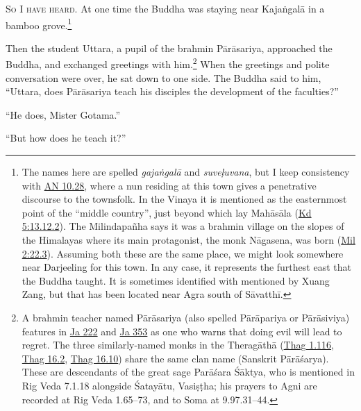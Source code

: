 \documentclass[12pt,openany]{book}%
\newcommand*{\langlzh}[1]{\cjk{#1}\normalfont}%
\newcommand*{\scevam}[1]{\textsc{#1}}
\begin{document}
\scevam{So I have heard. }At one time the Buddha was staying near \textsanskrit{Kajaṅgalā} in a bamboo grove.\footnote{The names here are spelled \textit{\textsanskrit{gajaṅgalā}} and \textit{\textsanskrit{suveḷuvana}}, but I keep consistency with \href{https://suttacentral.net/an10.28/en/sujato}{AN 10.28}, where a nun residing at this town gives a penetrative discourse to the townsfolk. In the Vinaya it is mentioned as the easternmost point of the “middle country”, just beyond which lay \textsanskrit{Mahāsāla} (\href{https://suttacentral.net/pli-tv-kd5/en/sujato\#13.12.2}{Kd 5:13.12.2}). The \textsanskrit{Milindapañha} says it was a brahmin village on the slopes of the Himalayas where its main protagonist, the monk \textsanskrit{Nāgasena}, was born (\href{https://suttacentral.net/mil2/en/sujato\#22.3}{Mil 2:22.3}). Assuming both these are the same place, we might look somewhere near Darjeeling for this town. In any case, it represents the furthest east that the Buddha taught. It is sometimes identified with \langlzh{羯蠅揭羅} mentioned by Xuang Zang, but that has been located near Agra south of \textsanskrit{Sāvatthī}. } 

Then the student Uttara, a pupil of the brahmin \textsanskrit{Pārāsariya}, approached the Buddha, and exchanged greetings with him.\footnote{A brahmin teacher named \textsanskrit{Pārāsariya} (also spelled \textsanskrit{Pārāpariya} or \textsanskrit{Pārāsiviya}) features in \href{https://suttacentral.net/ja222/en/sujato}{Ja 222} and \href{https://suttacentral.net/ja353/en/sujato}{Ja 353} as one who warns that doing evil will lead to regret. The three similarly-named monks in the \textsanskrit{Theragāthā} (\href{https://suttacentral.net/thag1.116/en/sujato}{Thag 1.116}, \href{https://suttacentral.net/thag16.2/en/sujato}{Thag 16.2}, \href{https://suttacentral.net/thag16.10/en/sujato}{Thag 16.10}) share the same clan name (Sanskrit \textsanskrit{Pārāśarya}). These are descendants of the great sage \textsanskrit{Parāśara} \textsanskrit{Śāktya}, who is mentioned in Rig Veda 7.1.18 alongside \textsanskrit{Śatayātu}, \textsanskrit{Vasiṣṭha}; his prayers to Agni are recorded at Rig Veda 1.65–73, and to Soma at 9.97.31–44. } When the greetings and polite conversation were over, he sat down to one side. The Buddha said to him, “Uttara, does \textsanskrit{Pārāsariya} teach his disciples the development of the faculties?” 

“He does, Mister Gotama.” 

“But how does he teach it?” 
\end{document}
